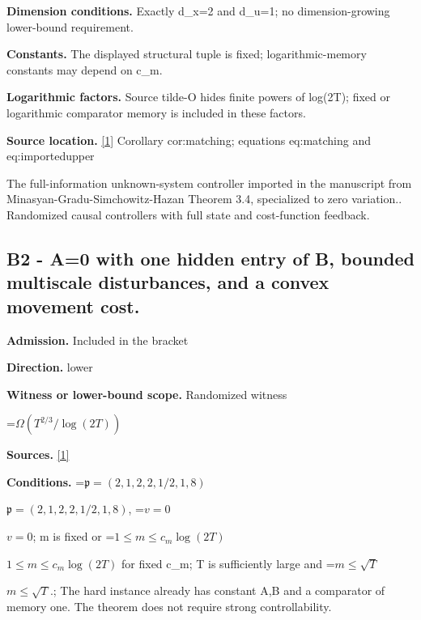 \documentclass[10pt,a4paper]{article}
\newcommand{\AtlasMath}[1]{\par\begingroup\centering\setbox0=\hbox{$\displaystyle #1$}\ifdim\wd0>1.4\linewidth\typeout{ATLAS WIDE FORMULA: \the\wd0}\fi\ifdim\wd0>\linewidth\resizebox{\linewidth}{!}{\box0}\else\box0\fi\par\endgroup}
\newcommand{\AtlasInlineMath}[1]{\begingroup\setbox0=\hbox{$#1$}\ifdim\wd0>.4\linewidth\endgroup\AtlasMath{#1}\else\endgroup$#1$\fi}
\begin{document}
\textbf{Dimension conditions.} Exactly d\_x=2 and d\_u=1; no dimension-growing lower-bound requirement.



\textbf{Constants.} The displayed structural tuple is fixed; logarithmic-memory constants may depend on c\_m.



\textbf{Logarithmic factors.} Source tilde-O hides finite powers of log(2T); fixed or logarithmic comparator memory is included in these factors.



\textbf{Source location.} \href{https://github.com/WU-Wendao/Colombo/blob/main/colombo_sensorium/Complexity_altas/data/sources/colombo/Q6/manuscript.pdf}{[1]} Corollary cor:matching; equations eq:matching and eq:importedupper



The full-information unknown-system controller imported in the manuscript from Minasyan-Gradu-Simchowitz-Hazan Theorem 3.4, specialized to zero variation.. Randomized causal controllers with full state and cost-function feedback.



\subsection{B2 - A=0 with one hidden entry of B, bounded multiscale disturbances, and a convex movement cost.}


\textbf{Admission.} Included in the bracket



\textbf{Direction.} lower



\textbf{Witness or lower-bound scope.} Randomized witness



\AtlasMath{\Omega(T^{2/3}/\log(2T))}


\textbf{Sources.} \href{https://github.com/WU-Wendao/Colombo/blob/main/colombo_sensorium/Complexity_altas/data/sources/colombo/Q6/manuscript.pdf}{[1]}



\textbf{Conditions.} \AtlasInlineMath{\mathfrak p=(2,1,2,2,1/2,1,8)}, \AtlasInlineMath{v=0}; m is fixed or \AtlasInlineMath{1\le m\le c_m\log(2T)} for fixed c\_m; T is sufficiently large and \AtlasInlineMath{m\le\sqrt T}.; The hard instance already has constant A,B and a comparator of memory one. The theorem does not require strong controllability.
\end{document}

